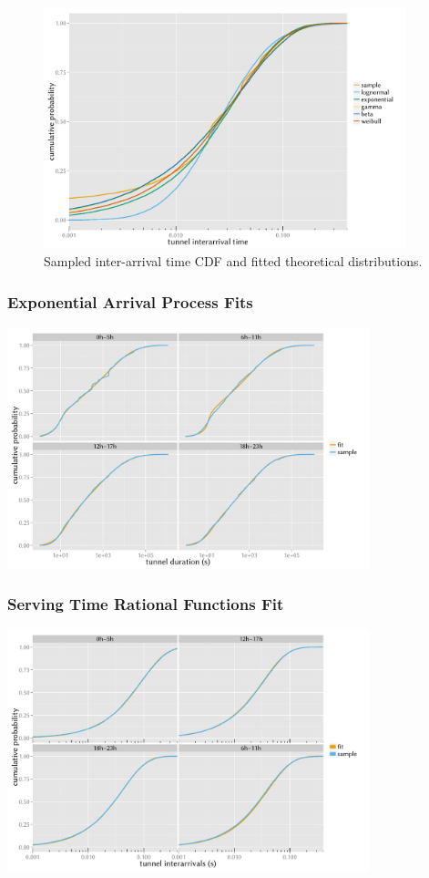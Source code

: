 \documentclass{beamer}
\begin{document}
\begin{frame}
	\begin{figure}[htb]
		\centering
		\includegraphics[height=7cm]{../../chapters/04-mobilenets/images/R-IAT-ecdfs.pdf}
		\caption{Sampled inter-arrival time CDF and fitted theoretical distributions.}
	\end{figure}
\end{frame}

\begin{frame}
	\frametitle{Exponential Arrival Process Fits}

	\begin{center}
		\includegraphics[height=7cm]{../../chapters/04-mobilenets/images/R-duration-fit-cdf-facets.pdf}
	\end{center}
\end{frame}

\begin{frame}
	\frametitle{Serving Time Rational Functions Fit}

	\begin{center}
		\includegraphics[height=7cm]{../../chapters/04-mobilenets/images/R-IAT-active-fit-cdf-facets.pdf}
	\end{center}
\end{frame}
\end{document}
